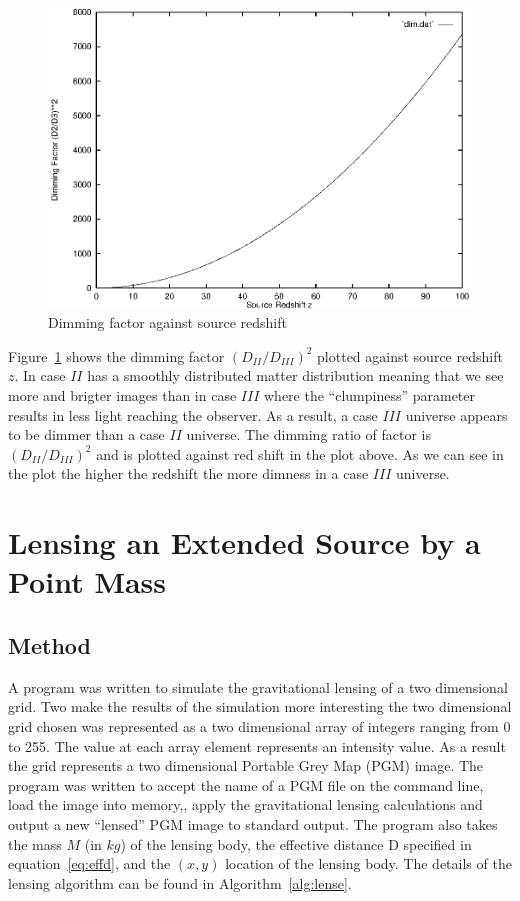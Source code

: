 \documentclass[aspectratio=1610,xcolor=dvipsnames,t]{beamer}
\begin{document}
\begin{figure}
    \caption{Dimming factor against source redshift}
    \label{fig:dimming}
    \begin{center}
        \includegraphics[width=\columnwidth]{results/dim.eps}
    \end{center}
\end{figure}

Figure~\ref{fig:dimming} shows the dimming factor $(D_{II}/D_{III})^2$ plotted
against source redshift $z$. In case $II$ has a smoothly distributed
matter distribution meaning that we see more and brigter images than
in case $III$ where the ``clumpiness'' parameter results in less
light reaching the observer. As a result, a case $III$ universe appears
to be dimmer than a case $II$ universe. The dimming ratio of factor
is $(D_{II}/D_{III})^2$ and is plotted against red shift in the plot above.
As we can see in the plot the higher the redshift the more dimness in
a case $III$ universe.

\section{Lensing an Extended Source by a Point Mass}
    \subsection{Method}
    A program was written to simulate the gravitational lensing 
    of a two dimensional grid. Two make the results of the simulation
    more interesting the two dimensional grid chosen was represented
    as a two dimensional array of integers ranging from 0 to 255.
    The value at each array element represents an intensity value. As a result
    the grid represents a two dimensional Portable Grey Map (PGM) image.
    The program was written to accept the name of a PGM file on the command
    line, load the image into memory,, apply the gravitational lensing calculations
    and output a new ``lensed'' PGM image to standard output. The program
    also takes the mass $M$ (in $kg$) of the lensing body, the effective
    distance D specified in equation~\ref{eq:effd}, and the $(x,y)$
    location of the lensing body.
    The details of the lensing algorithm can be found in Algorithm~\ref{alg:lense}.
\end{document}
